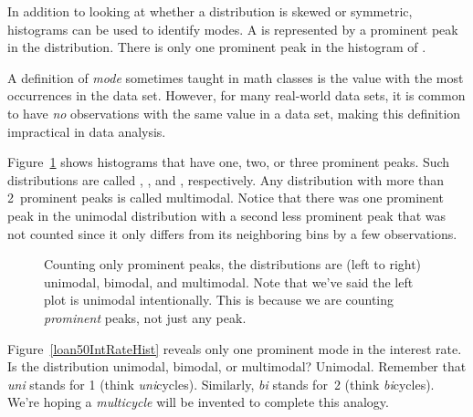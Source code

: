 In addition to looking at whether a distribution is skewed
or symmetric, histograms can be used to identify modes.
A  is represented by a prominent peak in the
distribution.
There is only one prominent peak in the histogram of
.

A definition of \emph{mode} sometimes
taught in math classes is the value with the
most occurrences in the data set.
However, for many real-world data sets, it is common to have
\emph{no} observations with the same value in a data set,
making this definition impractical in data analysis.

Figure~\ref{singleBiMultiModalPlots} shows histograms that
have one, two, or three prominent peaks.
Such distributions are called
,
, and
, respectively.
Any distribution with more than 2~prominent peaks is
called multimodal.
Notice that there was one prominent peak in the unimodal
distribution with a second less prominent peak that was
not counted since it only differs from its neighboring
bins by a few observations.

\begin{figure}[h]
  \centering
  \caption{Counting only prominent peaks, the
      distributions are (left to right) unimodal,
      bimodal, and multimodal.
      Note that we've said the left plot is unimodal
      intentionally.
      This is because we are counting \emph{prominent}
      peaks, not just any peak.}
  \label{singleBiMultiModalPlots}
\end{figure}

\begin{examplewrap}
\begin{nexample}{Figure~\ref{loan50IntRateHist}
    reveals only one prominent mode in the interest rate.
    Is the distribution unimodal, bimodal, or multimodal?}
  Unimodal.
  Remember that \emph{uni} stands for 1 (think \emph{uni}cycles).
  Similarly, \emph{bi} stands for~2 (think \emph{bi}cycles).
  We're hoping a \emph{multicycle} will be invented to complete
  this analogy.
\end{nexample}
\end{examplewrap}

